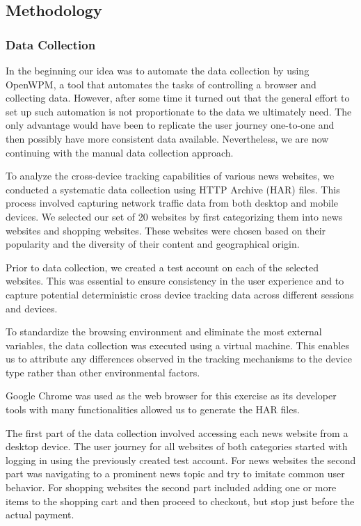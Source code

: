 \subsection{Methodology}
\subsubsection{Data Collection}
In the beginning our idea was to automate the data collection by using OpenWPM, a tool that automates the tasks of controlling a browser and collecting data. However, after some time it turned out that the general effort to set up such automation is not proportionate to the data we ultimately need. The only advantage would have been to replicate the user journey one-to-one and then possibly have more consistent data available. Nevertheless, we are now continuing with the manual data collection approach.

To analyze the cross-device tracking capabilities of various news websites, we conducted a systematic data collection using HTTP Archive (HAR) files. This process involved capturing network traffic data from both desktop and mobile devices. We selected our set of 20 websites by first categorizing them into news websites and shopping websites. These websites were chosen based on their popularity and the diversity of their content and geographical origin.

Prior to data collection, we created a test account on each of the selected websites. This was essential to ensure consistency in the user experience and to capture potential deterministic cross device tracking data across different sessions and devices.

To standardize the browsing environment and eliminate the most external variables, the data collection was executed using a virtual machine. This enables us to attribute any differences observed in the tracking mechanisms to the device type rather than other environmental factors.

Google Chrome was used as the web browser for this exercise as its developer tools with many functionalities allowed us to generate the HAR files. 

The first part of the data collection involved accessing each news website from a desktop device. The user journey for all websites of both categories started with logging in using the previously created test account. For news websites the second part was navigating to a prominent news topic and try to imitate common user behavior. For shopping websites the second part included adding one or more items to the shopping cart and then proceed to checkout, but stop just before the actual payment. 


